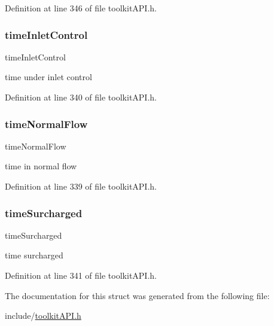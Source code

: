 Definition at line 346 of file toolkit\+A\+P\+I.\+h.

\mbox{\label{struct_s_m___link_stats_aaa492ecf4dbe89b0492681c4fedfde2b}} 
\subsubsection{\texorpdfstring{time\+Inlet\+Control}{timeInletControl}}
{\footnotesize\ttfamily time\+Inlet\+Control}

time under inlet control 

Definition at line 340 of file toolkit\+A\+P\+I.\+h.

\mbox{\label{struct_s_m___link_stats_a280dc840607ae09223dc876b8c56dd3a}} 
\subsubsection{\texorpdfstring{time\+Normal\+Flow}{timeNormalFlow}}
{\footnotesize\ttfamily time\+Normal\+Flow}

time in normal flow 

Definition at line 339 of file toolkit\+A\+P\+I.\+h.

\mbox{\label{struct_s_m___link_stats_ae5c6e5a148cd0c7920e6298adccd4648}} 
\subsubsection{\texorpdfstring{time\+Surcharged}{timeSurcharged}}
{\footnotesize\ttfamily time\+Surcharged}

time surcharged 

Definition at line 341 of file toolkit\+A\+P\+I.\+h.



The documentation for this struct was generated from the following file\+:\begin{DoxyCompactItemize}
\item 
include/\hyperlink{toolkit_a_p_i_8h}{toolkit\+A\+P\+I.\+h}\end{DoxyCompactItemize}
